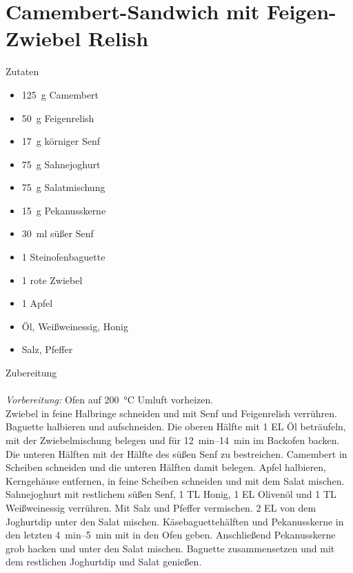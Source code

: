 \section*{Camembert-Sandwich mit Feigen-Zwiebel Relish}
\ihead{}\ohead{}
\cfoot{}
{\Large Zutaten}
\begin{multicols}{2}
\begin{itemize}
    \item \SI{125}{g} Camembert
    \item \SI{50}{g} Feigenrelish
    \item \SI{17}{g} körniger Senf
    \item \SI{75}{g} Sahnejoghurt
    \item \SI{75}{g} Salatmischung
    \item \SI{15}{g} Pekanusskerne
    \item \SI{30}{ml} süßer Senf
    \item \num{1} Steinofenbaguette
    \item \num{1} rote Zwiebel
    \item \num{1} Apfel
    \item Öl, Weißweinessig, Honig
    \item Salz, Pfeffer
\end{itemize}
\end{multicols}
\noindent
{\Large Zubereitung}\\
\\
\textit{Vorbereitung:} Ofen auf \SI{200}{\celsius} Umluft vorheizen.\\
Zwiebel in feine Halbringe schneiden und mit Senf und Feigenrelish verrühren. 
Baguette halbieren und aufschneiden. 
Die oberen Hälfte mit \num{1} EL Öl beträufeln, mit der Zwiebelmischung belegen und für \SIrange{12}{14}{min} im Backofen backen.
Die unteren Hälften mit der Hälfte des süßen Senf zu bestreichen. 
Camembert in Scheiben schneiden und die unteren Hälften damit belegen. 
Apfel halbieren, Kerngehäuse entfernen, in feine Scheiben schneiden und mit dem Salat mischen.
Sahnejoghurt mit restlichem süßen Senf, \num{1} TL Honig, \num{1} EL Olivenöl und \num{1} TL Weißweinessig verrühren. 
Mit Salz und Pfeffer vermischen.
\num{2} EL von dem Joghurtdip unter den Salat mischen.
Käsebaguettehälften und Pekanusskerne in den letzten \SIrange{4}{5}{min} mit in den Ofen geben. 
Anschließend Pekanusskerne grob hacken und unter den Salat mischen. 
Baguette zusammensetzen und mit dem restlichen Joghurtdip und Salat genießen.
